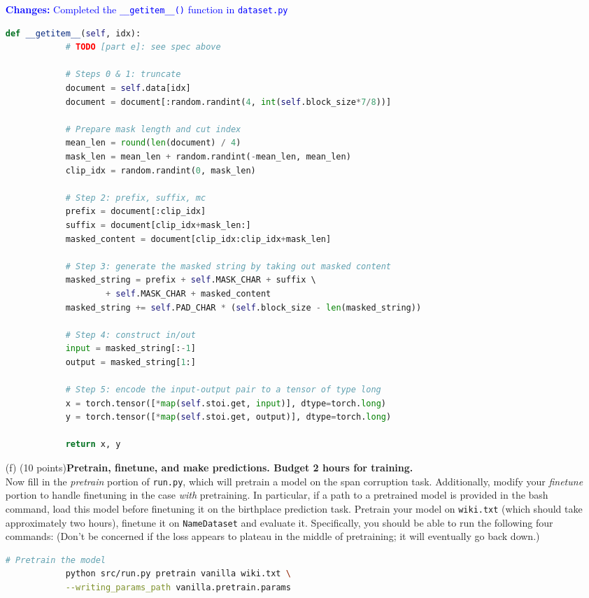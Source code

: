 \documentclass[letterpaper,12pt]{article}
\begin{document}
\begin{itemize}
		\textcolor{blue}{\textbf{Changes:}  Completed the \texttt{\_\_getitem\_\_()} function in \texttt{dataset.py}
		}
		\begin{lstlisting}[language=python, basicstyle=\small\ttfamily]
			def __getitem__(self, idx):
			# TODO [part e]: see spec above
			
			# Steps 0 & 1: truncate
			document = self.data[idx]
			document = document[:random.randint(4, int(self.block_size*7/8))]
			
			# Prepare mask length and cut index
			mean_len = round(len(document) / 4)
			mask_len = mean_len + random.randint(-mean_len, mean_len)
			clip_idx = random.randint(0, mask_len)
			
			# Step 2: prefix, suffix, mc
			prefix = document[:clip_idx]
			suffix = document[clip_idx+mask_len:]
			masked_content = document[clip_idx:clip_idx+mask_len]
			
			# Step 3: generate the masked string by taking out masked content
			masked_string = prefix + self.MASK_CHAR + suffix \ 
					+ self.MASK_CHAR + masked_content
			masked_string += self.PAD_CHAR * (self.block_size - len(masked_string))
			
			# Step 4: construct in/out
			input = masked_string[:-1]
			output = masked_string[1:]
			
			# Step 5: encode the input-output pair to a tensor of type long
			x = torch.tensor([*map(self.stoi.get, input)], dtype=torch.long)
			y = torch.tensor([*map(self.stoi.get, output)], dtype=torch.long)
			
			return x, y
		\end{lstlisting}

	\item[(f)]
		(10 points)\textbf{Pretrain, finetune, and make predictions. Budget 2 hours for training.}\\
		Now fill in the \textit{pretrain} portion of \texttt{run.py}, which will pretrain a model on the span corruption task. Additionally, modify your \textit{finetune} portion to handle finetuning in the case \textit{with} pretraining. In particular, if a path to a pretrained model is provided in the bash command, load this model before finetuning it on the birthplace prediction task.
		Pretrain your model on \texttt{wiki.txt} (which should take approximately two hours), finetune it on \texttt{NameDataset} and evaluate it. Specifically, you should be able to run the following four commands:
		(Don't be concerned if the loss appears to plateau in the middle of pretraining; it will eventually go back down.)
		\begin{lstlisting}[basicstyle=\ttfamily, language=bash]
			# Pretrain the model
			python src/run.py pretrain vanilla wiki.txt \
			--writing_params_path vanilla.pretrain.params
			

\end{lstlisting}
\end{itemize}
\end{document}
